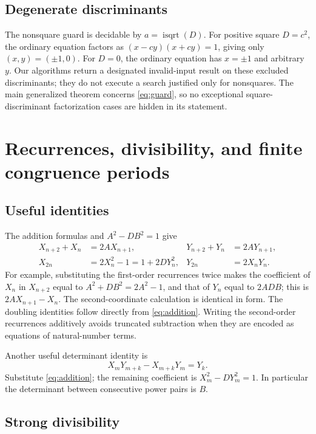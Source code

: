 \documentclass[11pt,letterpaper]{article}
\theoremstyle{definition}
\newcommand{\isqrt}{\operatorname{isqrt}}
\begin{document}
\subsection{Degenerate discriminants}

The nonsquare guard is decidable by $a=\isqrt(D)$. For positive square
$D=c^2$, the ordinary equation factors as
$(x-cy)(x+cy)=1$, giving only $(x,y)=(\pm1,0)$.
For $D=0$, the ordinary equation has $x=\pm1$ and arbitrary $y$.
Our algorithms return a designated invalid-input result on these excluded
discriminants; they do not execute a search justified only for nonsquares.
The main generalized theorem concerns \eqref{eq:guard}, so no exceptional
square-discriminant factorization cases are hidden in its statement.

\section{Recurrences, divisibility, and finite congruence periods}\label{sec:arithmeticstructure}

\subsection{Useful identities}

The addition formulas and $A^2-DB^2=1$ give
\begin{align}
 X_{n+2}+X_n&=2AX_{n+1},&
 Y_{n+2}+Y_n&=2AY_{n+1},\label{eq:secondorder}\\
 X_{2n}&=2X_n^2-1=1+2DY_n^2,&
 Y_{2n}&=2X_nY_n.\label{eq:doubling}
\end{align}
For example, substituting the first-order recurrences twice makes the
coefficient of $X_n$ in $X_{n+2}$ equal to
$A^2+DB^2=2A^2-1$, and that of $Y_n$ equal to $2ADB$;
this is $2AX_{n+1}-X_n$. The second-coordinate calculation is identical
in form. The doubling identities follow directly from \eqref{eq:addition}.
Writing the second-order recurrences additively avoids truncated subtraction
when they are encoded as equations of natural-number terms.

Another useful determinant identity is
\begin{equation}\label{eq:powerdet}
 X_mY_{m+k}-X_{m+k}Y_m=Y_k.
\end{equation}
Substitute \eqref{eq:addition}; the remaining coefficient is
$X_m^2-DY_m^2=1$. In particular the determinant between consecutive
power pairs is $B$.

\subsection{Strong divisibility}
\end{document}
